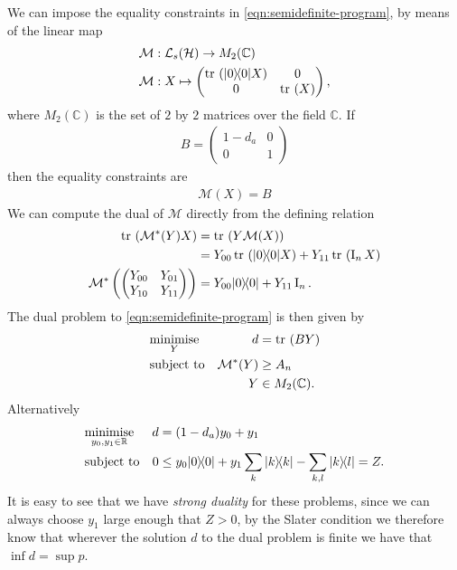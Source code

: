 We can impose the equality constraints in \eqref{eqn:semidefinite-program}, by means of the linear map
\begin{align}
  \mathcal{M}&: \saops[\hcal] \to M_2(\mathbb{C})\\
  \mathcal{M}&:X \mapsto \begin{pmatrix}\tr{\ketbra{0}{0} X} & 0 \\ 0 & \tr{X}\end{pmatrix},
\end{align}
where $M_2(\mathbb{C})$ is the set of $2$ by $2$ matrices over the field $\mathbb{C}$. If
\begin{align}
  B = \begin{pmatrix}1-d_a & 0 \\ 0 & 1\end{pmatrix}
\end{align}
then the equality constraints are
\begin{align}
  \mathcal{M}(X) = B
\end{align}
We can compute the dual of $\mathcal{M}$ directly from the defining relation
\begin{align}
  \tr{\mathcal{M}^*(Y) X} &= \tr{Y \mathcal{M}(X)}\\
                          &= Y_{00} \tr{\ketbra{0}{0}X} + Y_{11} \tr{\opi_n X} \\
  \mathcal{M}^*\left(\begin{pmatrix}Y_{00} & Y_{01} \\ Y_{10} & Y_{11}\end{pmatrix}\right) &= Y_{00} \ketbra{0}{0} + Y_{11}\opi_n.
\end{align}
The dual problem to \eqref{eqn:semidefinite-program} is then given by
\begin{equation}
  \begin{aligned}
    & \underset{Y}{\text{minimise}}
    & d &= \tr{B Y} \\
    & \text{subject to}
    & \mathcal{M}^*(Y) &\geq A_n\\
    && Y &\in M_2(\mathbb{C}).
  \end{aligned}
  \label{eqn:semidefinite-program-dual}
\end{equation}
Alternatively 
\begin{equation}
  \begin{aligned}
    & \underset{y_0, y_1\in\mathbb{R}}{\text{minimise}}
    & d &= (1-d_a)y_0 + y_1 \\
    & \text{subject to}
    & 0&\leq y_0 |0\rangle\!\langle0| + y_1 \sum_k |k\rangle\!\langle k| - \sum_{k,l} |k\rangle\!\langle l| = Z.
  \end{aligned}
\end{equation}
It is easy to see that we have \emph{strong duality} for these problems, since we can always choose $y_1$ large enough that $Z > 0$, by the Slater condition\cite{rtr-conv-anal-book} we therefore know that wherever the solution $d$ to the dual problem is finite we have that $\inf d=\sup p$.

